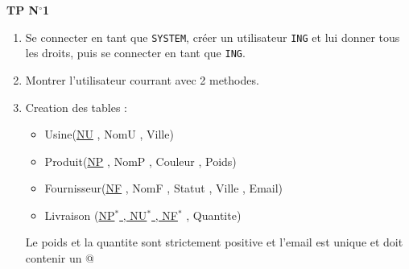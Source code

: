 \documentclass{article}
\newcommand{\tit}[1]{
\begin{center}
    \Large{\textbf{{#1}}}
\end{center}
}
\begin{document}
\tit{TP N\(^{\boldsymbol{\circ}}\)\hspace{0.1cm}1}
\begin{enumerate}
\item Se connecter en tant que \texttt{SYSTEM}, créer un utilisateur \texttt{ING} et lui donner tous les droits,  
 puis se connecter en tant que \texttt{ING}.
\item Montrer l'utilisateur courrant avec 2 methodes.
\item Creation des tables :
    \begin{itemize}
        \item Usine(\underline{NU} , NomU , Ville)
        \item Produit(\underline{NP} , NomP , Couleur , Poids)
        \item Fournisseur(\underline{NF} , NomF , Statut , Ville , Email)
        \item Livraison (\underline{NP\(^*\) , NU\(^*\) , NF\(^*\)} , Quantite)
    \end{itemize}
 Le poids et la quantite sont strictement positive et l'email est unique et doit contenir un @


\end{enumerate}
\end{document}
